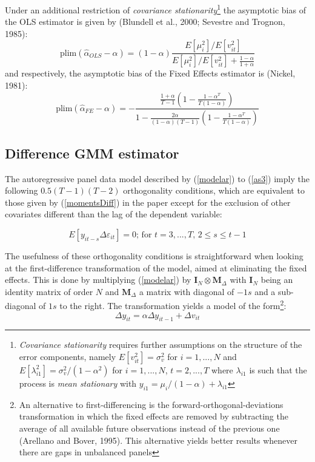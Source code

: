 \documentclass[a4paper, 12pt]{article}
\begin{document}
Under an additional restriction of \emph{covariance stationarity}\footnote{\emph{Covariance stationarity} requires further assumptions on the structure of the error components, namely $E[v_{it}^2]=\sigma_v^2$ for $i=1,...,N$ and $E[\lambda_{i1}^2]=\sigma_v^2 / (1-\alpha^2)$ for $i=1,...,N$, $t=2,...,T$ where $\lambda_{i1}$ is such that the process is \emph{mean stationary} with $y_{i1}=\mu_{i}/(1-\alpha)+\lambda_{i1}$} the asymptotic bias of the OLS estimator is given by (Blundell et al., 2000; Sevestre and Trognon, 1985):
\[
\text{plim}\left(\hat\alpha_{OLS}-\alpha \right) =\left(1-\alpha\right)\frac{E[\mu_i^2]/E[v_{it}^2]}{E[\mu_i^2]/E[v_{it}^2]+\frac{1-\alpha}{1+\alpha}}
\]
and respectively, the asymptotic bias of the Fixed Effects estimator is (Nickel, 1981):
\[
\text{plim}\left(\hat\alpha_{FE}-\alpha \right)=-\frac{\frac{1+\alpha}{T-1}\left(1-\frac{1-\alpha^T}{T(1-\alpha)}\right)}{1-\frac{2\alpha}{(1-\alpha)(T-1)}\left(1-\frac{1-\alpha^T}{T(1-\alpha)}\right)}
\]

\subsection*{Difference GMM estimator}

The autoregressive panel data model described by (\ref{modelar}) to (\ref{as3}) imply the following $0.5(T-1)(T-2)$ orthogonality conditions, which are equivalent to those given by (\ref{momentsDiff}) in the paper except for the exclusion of other covariates different than the lag of the dependent variable:

\begin{equation}
\label{momentsDiffAp}
\tag{5'}
E\left[ y_{it-s}\Delta \varepsilon_{it}\right]=0 \text{; for $t=3,...,T$, $2\leq s \leq t-1$}
\end{equation}

The usefulness of these orthogonality conditions is straightforward when looking at the first-difference transformation of the model, aimed at eliminating the fixed effects. This is done by multiplying (\ref{modelar}) by $\mathbf{I}_N \otimes \mathbf{M}_{\Delta}$ with $\mathbf{I}_N$ being an identity matrix of order $N$ and $\mathbf{M}_{\Delta}$ a matrix with diagonal of $-1s$ and a sub-diagonal of $1s$ to the right. The transformation yields a model of the form\footnote{An alternative to first-differencing is the forward-orthogonal-deviations transformation in which the fixed effects are removed by subtracting the average of all available future observations instead of the previous one (Arellano and Bover, 1995). This alternative yields better results whenever there are gaps in unbalanced panels}:
\[
\Delta y_{it}=\alpha \Delta y_{it-1} +\Delta v_{it}
\]
\end{document}

